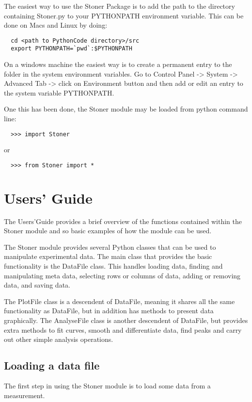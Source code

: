 \documentclass[a4paper,11pt]{scrartcl}
\begin{document}
The easiest way to use the Stoner Package is to add the path to the directory containing Stoner.py to your PYTHONPATH environment variable. This can be done on Macs and Linux by doing:
\begin{verbatim}
  cd <path to PythonCode directory>/src
  export PYTHONPATH=`pwd`:$PYTHONPATH
\end{verbatim}
On a windows machine the easiest way is to create a permanent entry to the folder in the system environment variables. Go to Control Panel -> System -> Advanced Tab -> click on Environment button and then add or edit an entry to the system variable PYTHONPATH.

One this has been done, the Stoner module may be loaded from python command line:

\begin{verbatim}
  >>> import Stoner
\end{verbatim}

or

\begin{verbatim}
  >>> from Stoner import *
\end{verbatim}

\section{Users' Guide}

The Users'Guide provides a brief overview of the functions contained within the Stoner module and so basic examples of how the module can be used.

The Stoner module provides several Python classes that can be used to manipulate experimental data. The main class that provides the basic functionality is the DataFile class. This handles loading data, finding and manipulating meta data, selecting rows or columns of data, adding or removing data, and saving data.

The PlotFile class is a descendent of DataFile, meaning it shares all the same functionality as DataFile, but in addition has methods to present data graphically. The AnalyseFile class is another descendent of DataFile, but provides extra methods to fit curves, smooth and differentiate data, find peaks and carry out other simple analysis operations.

\subsection{Loading a data file}

The first step in using the Stoner module is to load some data from a measurement.
\end{document}
